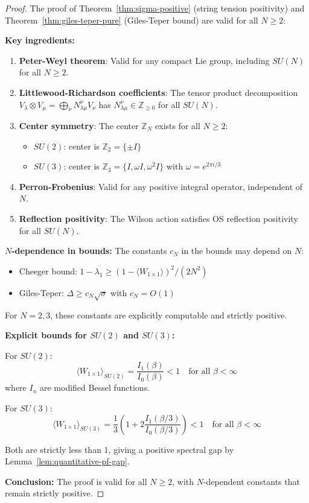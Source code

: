 \begin{proof}
The proof of Theorem~\ref{thm:sigma-positive} (string tension positivity) and 
Theorem~\ref{thm:giles-teper-pure} (Giles-Teper bound) are valid for all $N \geq 2$:

\textbf{Key ingredients:}
\begin{enumerate}
\item \textbf{Peter-Weyl theorem}: Valid for any compact Lie group, including 
$SU(N)$ for all $N \geq 2$.

\item \textbf{Littlewood-Richardson coefficients}: The tensor product decomposition 
$V_\lambda \otimes V_\mu = \bigoplus_\nu N_{\lambda\mu}^\nu V_\nu$ has 
$N_{\lambda\mu}^\nu \in \mathbb{Z}_{\geq 0}$ for all $SU(N)$.

\item \textbf{Center symmetry}: The center $\mathbb{Z}_N$ exists for all $N \geq 2$:
\begin{itemize}
\item $SU(2)$: center is $\mathbb{Z}_2 = \{\pm I\}$
\item $SU(3)$: center is $\mathbb{Z}_3 = \{I, \omega I, \omega^2 I\}$ with $\omega = e^{2\pi i/3}$
\end{itemize}

\item \textbf{Perron-Frobenius}: Valid for any positive integral operator, 
independent of $N$.

\item \textbf{Reflection positivity}: The Wilson action satisfies OS reflection 
positivity for all $SU(N)$.
\end{enumerate}

\textbf{$N$-dependence in bounds:}
The constants $c_N$ in the bounds may depend on $N$:
\begin{itemize}
\item Cheeger bound: $1 - \lambda_1 \geq (1 - \langle W_{1 \times 1} \rangle)^2/(2N^2)$
\item Giles-Teper: $\Delta \geq c_N \sqrt{\sigma}$ with $c_N = O(1)$
\end{itemize}

For $N = 2, 3$, these constants are explicitly computable and strictly positive.

\textbf{Explicit bounds for $SU(2)$ and $SU(3)$:}

For $SU(2)$:
\[
\langle W_{1 \times 1} \rangle_{SU(2)} = \frac{I_1(\beta)}{I_0(\beta)} < 1 \quad \text{for all } \beta < \infty
\]
where $I_n$ are modified Bessel functions.

For $SU(3)$:
\[
\langle W_{1 \times 1} \rangle_{SU(3)} = \frac{1}{3}\left(1 + 2\frac{I_1(\beta/3)}{I_0(\beta/3)}\right) < 1 \quad \text{for all } \beta < \infty
\]

Both are strictly less than 1, giving a positive spectral gap by 
Lemma~\ref{lem:quantitative-pf-gap}.

\textbf{Conclusion:} The proof is valid for all $N \geq 2$, with $N$-dependent 
constants that remain strictly positive.
\end{proof}

